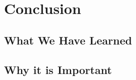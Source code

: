 \chapter{Conclusion}\label{ch:conclusion}

\section{What We Have Learned}


\section{Why it is Important}